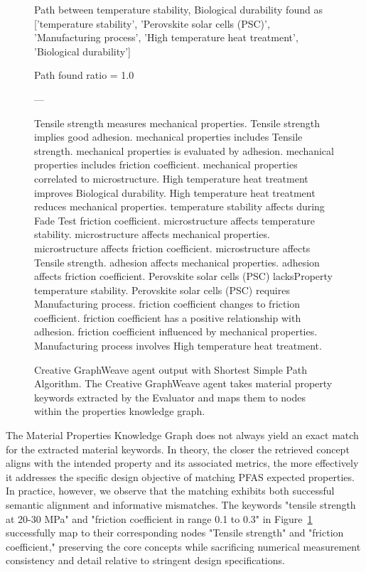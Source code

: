 \begin{figure}[t!]
\begin{mdframed}
    Path between temperature stability, Biological durability found as ['temperature stability', 'Perovskite solar cells (PSC)', 'Manufacturing process', 'High temperature heat treatment', 'Biological durability']
    
    Path found ratio = 1.0
    
    ---
    
    \textbf{}
    
    Tensile strength measures mechanical properties. Tensile strength implies good adhesion. mechanical properties includes Tensile strength. mechanical properties is evaluated by adhesion. mechanical properties includes friction coefficient. mechanical properties correlated to microstructure. High temperature heat treatment improves Biological durability. High temperature heat treatment reduces mechanical properties. temperature stability affects during Fade Test friction coefficient. microstructure affects temperature stability. microstructure affects mechanical properties. microstructure affects friction coefficient. microstructure affects Tensile strength. adhesion affects mechanical properties. adhesion affects friction coefficient. Perovskite solar cells (PSC) lacksProperty temperature stability. Perovskite solar cells (PSC) requires Manufacturing process. friction coefficient changes to friction coefficient. friction coefficient has a positive relationship with adhesion. friction coefficient influenced by mechanical properties. Manufacturing process involves High temperature heat treatment. 
    
  \end{mdframed}
  \caption{Creative GraphWeave agent output with Shortest Simple Path Algorithm. The Creative GraphWeave agent takes material property keywords extracted by the Evaluator and maps them to nodes within the properties knowledge graph.}
  \label{fig:shortest_path}
\end{figure}

The Material Properties Knowledge Graph does not always yield an exact match for the extracted material keywords. In theory, the closer the retrieved concept aligns with the intended property and its associated metrics, the more effectively it addresses the specific design objective of matching PFAS expected properties. In practice, however, we observe that the matching exhibits both successful semantic alignment and informative mismatches. The keywords "tensile strength at 20-30 MPa" and "friction coefficient in range 0.1 to 0.3" in Figure~\ref{fig:shortest_path} successfully map to their corresponding nodes "Tensile strength" and "friction coefficient," preserving the core concepts while sacrificing numerical  measurement consistency and detail relative to stringent design specifications. 

